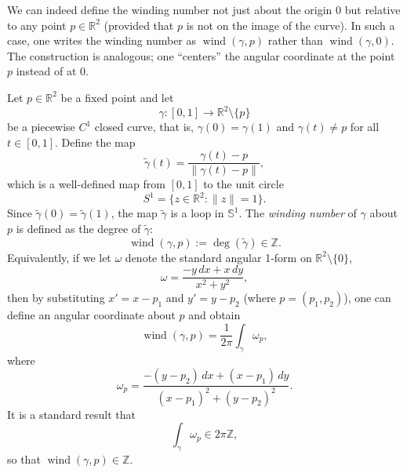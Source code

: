 \documentclass[11pt,openany]{article}
\begin{document}
\newpage
We can indeed define the winding number not just about the origin \(0\) but relative to any point \(p \in \mathbb{R}^2\) (provided that \(p\) is not on the image of the curve). In such a case, one writes the winding number as \(\operatorname{wind}(\gamma, p)\) rather than \(\operatorname{wind}(\gamma, 0)\). The construction is analogous; one “centers” the angular coordinate at the point \(p\) instead of at \(0\).

Let \(p \in \mathbb{R}^2\) be a fixed point and let \[
\gamma: [0,1] \to \mathbb{R}^2 \setminus \{p\}
\] be a piecewise \(C^1\) closed curve, that is, \(\gamma(0) = \gamma(1)\) and \(\gamma(t) \neq p\) for all \(t \in [0,1]\). Define the map
\[
\widetilde{\gamma}(t) = \frac{\gamma(t)-p}{\|\gamma(t)-p\|},
\] which is a well-defined map from \([0,1]\) to the unit circle
\[
S^1 = \{ z \in \mathbb{R}^2 : \|z\| = 1 \}.
\] Since \(\widetilde{\gamma}(0) = \widetilde{\gamma}(1)\), the map \(\widetilde{\gamma}\) is a loop in \(\mathbb{S}^1\). The \emph{winding number} of \(\gamma\) about \(p\) is defined as the degree of \(\widetilde{\gamma}\):
\[
\operatorname{wind}(\gamma, p) := \deg(\widetilde{\gamma}) \in \mathbb{Z}.
\]
Equivalently, if we let \(\omega\) denote the standard angular 1‑form on \(\mathbb{R}^2\setminus \{0\}\), \[
\omega = \frac{-y\,dx + x\,dy}{x^2+y^2},
\] then by substituting \(x' = x-p_1\) and \(y' = y-p_2\) (where \(p=(p_1, p_2)\)), one can define an angular coordinate about \(p\) and obtain \[
\operatorname{wind}(\gamma, p) = \frac{1}{2\pi} \int_\gamma \omega_p,
\] where \[
\omega_p = \frac{-(y-p_2)\,dx+(x-p_1)\,dy}{(x-p_1)^2+(y-p_2)^2}.
\] It is a standard result that \[
\int_\gamma \omega_p \in 2\pi\mathbb{Z},
\] so that \(\operatorname{wind}(\gamma, p) \in \mathbb{Z}\).

%
%
%
%
%
\end{document}
